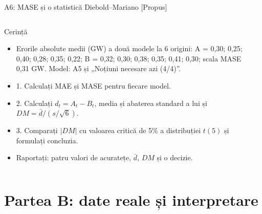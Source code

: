 \begin{frame}{A6: MASE și o statistică Diebold--Mariano [Propus]}
\propsub
\itemsize{\scriptsize}
\begin{columns}[T]
\begin{column}{\taskw}
\begin{block}{Cerință}
\begin{itemize}
    \item Erorile absolute medii (GW) a două modele la 6 origini: A = 0,30; 0,25; 0,40; 0,28; 0,35; 0,22; B = 0,32; 0,30; 0,38; 0,35; 0,41; 0,30; scala MASE 0,31 GW. Model: A5 și „Noțiuni necesare azi (4/4)”.
    \item 1. Calculați MAE și MASE pentru fiecare model.
    \item 2. Calculați $d_t = A_t - B_t$, media și abaterea standard a lui și $DM = \bar d/(s/\sqrt{6})$.
    \item 3. Comparați $|DM|$ cu valoarea critică de 5\% a distribuției $t(5)$ și formulați concluzia.
    \item Raportați: patru valori de acuratețe, $\bar d$, $DM$ și o decizie.
\end{itemize}
\end{block}
\end{column}
\begin{column}{\solw}
\end{column}
\end{columns}
\end{frame}


\section{Partea B: date reale și interpretare}

